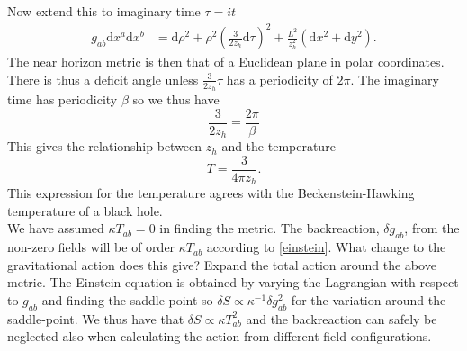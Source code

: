 \documentclass[12pt]{report}
\renewcommand{\d}{\ensuremath{\mathrm{d}}}
\renewcommand{\i}{\ensuremath{i}}
\begin{document}
Now extend this to imaginary time $\tau=\i t$
\begin{equation}
\begin{split}
 g_{ab}\d x^a\d x^b
&= \d \rho^2 +\rho^2\left(\frac{3}{2z_h}\d \tau\right)^2+\frac{L^2}{z_h^2}\left(\d x^2+\d y^2\right).
\end{split}
\end{equation}
The near horizon metric is then that of a Euclidean plane in polar coordinates. There is thus a deficit angle unless $\frac{3}{2z_h}\tau$ has a periodicity of $2\pi$. The imaginary time has periodicity $\beta$ so we thus have
\begin{equation}
 \frac{3}{2z_h}=\frac{2\pi}{\beta}
\end{equation}
This gives the relationship between $z_h$ and the temperature
\begin{equation}
 T=\frac{3}{4\pi  z_h}\label{T}.
\end{equation}
This expression for the temperature agrees with the Beckenstein-Hawking temperature of a black hole.\\

We have assumed $\kappa T_{ab}=0$ in finding the metric. The backreaction, $\delta g_{ab}$, from the non-zero fields will be of order $\kappa T_{ab}$ according to \eqref{einstein}. What change to the gravitational action does this give? Expand the total action around the above metric. The Einstein equation is obtained by varying the Lagrangian with respect to $g_{ab}$ and finding the saddle-point so $\delta S\propto\kappa^{-1}\delta g_{ab}^2$ for the variation around the saddle-point. We thus have that $\delta S\propto\kappa T_{ab}^2$ and the backreaction can safely be neglected also when calculating the action from different field configurations.\\
\end{document}
